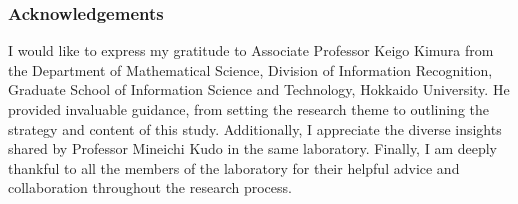 \documentclass[runningheads]{llncs}
\begin{document}
%

\subsubsection{Acknowledgements}
I would like to express my gratitude to Associate Professor Keigo Kimura from the Department of Mathematical Science, Division of Information Recognition, Graduate School of Information Science and Technology, Hokkaido University. He provided invaluable guidance, from setting the research theme to outlining the strategy and content of this study. Additionally, I appreciate the diverse insights shared by Professor Mineichi Kudo in the same laboratory. Finally, I am deeply thankful to all the members of the laboratory for their helpful advice and collaboration throughout the research process.

%
%
%


%
\end{document}

